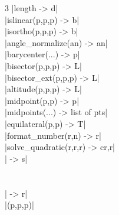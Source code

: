 \documentclass[DIV         = 14,
               fontsize    = 10,
               index       = totoc,
               twoside,
               cadre,
               headings    = small
               ]{tkz-doc}
\begin{document}
\begin{multicols}{3}
|length                     -> d|   \\
|islinear(p,p,p)            -> b|   \\
|isortho(p,p,p)             -> b|   \\
|angle_normalize(an)       -> an|  \\
|barycenter(...)            -> p|  \\
|bisector(p,p,p)            -> L|   \\
|bisector_ext(p,p,p)        -> L|   \\
|altitude(p,p,p)            -> L|   \\
|midpoint(p,p)              -> p|  \\
|midpoints(...)   -> list of pts|  \\
|equilateral(p,p)           -> T|   \\
|format_number(r,n)         -> r|   \\
|solve_quadratic(r,r,r)  -> cr,r|\\
|              -> s|   \\
                                   \\
             \\
|               -> r|   \\
|\tkzDrawLuaEllipse(p,p,p)|   \\
\end{multicols}
\end{document}
